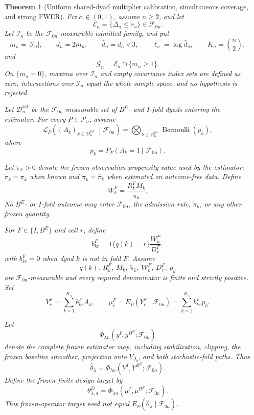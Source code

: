 \documentclass[11pt]{article}
\newtheorem{theorem}{Theorem}[section]
\theoremstyle{definition}
\newcommand{\1}{\mathbf 1}\newcommand{\op}{\operatorname}
\begin{document}
\begin{theorem}[Uniform shared-dyad multiplier calibration,\label{thm:fwer}
simultaneous coverage, and strong FWER]
\label{thm:uniform-shared-multiplier}
Fix $\alpha\in(0,1)$, assume $n\ge2$, and let
\[
\mathcal E_n=\{\Delta_n\le r_n\}\in\mathcal F_{0n}.
\]
Let $\mathcal I_n$ be the $\mathcal F_{0n}$-measurable admitted family,
and put
\[
m_n=|\mathcal I_n|,
\qquad
d_n=2m_n,
\qquad
\bar d_n=d_n\vee3,
\qquad
\ell_n=\log\bar d_n,
\qquad
K_n=\binom n2,
\]
and
\begin{equation}
\mathcal G_n
=
\mathcal E_n\cap\{m_n\ge1\}.
\label{eq:good-nonempty-event}
\end{equation}
On $\{m_n=0\}$, maxima over $\mathcal I_n$ and empty covariance index
sets are defined as zero, intersections over $\mathcal I_n$ equal the
whole sample space, and no hypothesis is rejected.

Let $\mathcal D_n^{\mathrm{act}}$ be the
$\mathcal F_{0n}$-measurable set of $B^E$- and $I$-fold dyads entering
the estimator. For every $P\in\mathcal P_n$, assume
\begin{equation}
\mathcal L_P\!\left(
(A_k)_{k\in\mathcal D_n^{\mathrm{act}}}
\,\middle|\,
\mathcal F_{0n}
\right)
=
\bigotimes_{k\in\mathcal D_n^{\mathrm{act}}}
\operatorname{Bernoulli}(p_k),
\label{eq:conditional-product-law}
\end{equation}
where
\[
p_k=P_P(A_k=1\mid\mathcal F_{0n}).
\]

Let $\widetilde\pi_k>0$ denote the frozen observation-propensity value
used by the estimator: $\widetilde\pi_k=\pi_k$ when known and
$\widetilde\pi_k=\widehat\pi_k$ when estimated on outcome-free data.
Define
\[
W_k^F=\frac{R_k^FM_k}{\widetilde\pi_k}.
\]
No $B^E$- or $I$-fold outcome may enter $\mathcal F_{0n}$, the
admission rule, $\widetilde\pi_k$, or any other frozen quantity.

For $F\in\{I,B^E\}$ and cell $r$, define
\[
b_{kr}^F
=
1\{q(k)=r\}\frac{W_k^F}{D_r^F},
\]
with $b_{kr}^F=0$ when dyad $k$ is not in fold $F$. Assume
\[
q(k),\ R_k^F,\ M_k,\ \widetilde\pi_k,\ W_k^F,\ D_r^F,\ p_k
\]
are $\mathcal F_{0n}$-measurable and every required denominator is
finite and strictly positive. Set
\[
Y_r^F
=
\sum_{k=1}^{K_n}b_{kr}^F A_k,
\qquad
\mu_r^F
=
E_P(Y_r^F\mid\mathcal F_{0n})
=
\sum_{k=1}^{K_n}b_{kr}^F p_k.
\]

Let
\[
\Phi_{\lambda n}(y^I,y^{B^E};\mathcal F_{0n})
\]
denote the complete frozen estimator map, including stabilization,
clipping, the frozen baseline smoother, projection onto $V_{J_0}$,
and both stochastic-fold paths. Thus
\[
\widehat\theta_\lambda
=
\Phi_{\lambda n}(Y^I,Y^{B^E};\mathcal F_{0n}).
\]
Define the frozen finite-design target by
\begin{equation}
\theta_{\lambda,n}^D
=
\Phi_{\lambda n}(\mu^I,\mu^{B^E};\mathcal F_{0n}).
\label{eq:finite-design-target}
\end{equation}
This frozen-operator target need not equal
$E_P(\widehat\theta_\lambda\mid\mathcal F_{0n})$.


\end{theorem}
\end{document}
